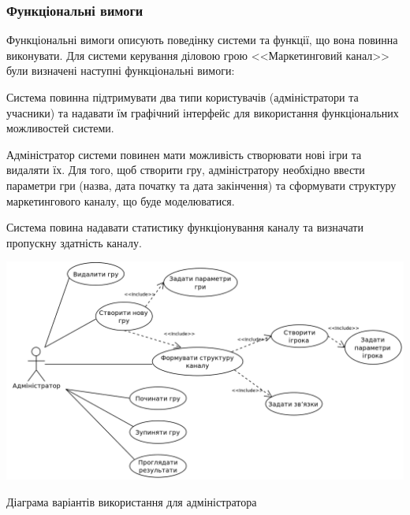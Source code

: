         \subsubsection{Функціональні вимоги}
Функціональні вимоги описують поведінку системи та функції, що вона повинна виконувати. Для системи керування діловою грою <<Маркетинговий канал>> були визначені наступні функціональні вимоги:
            \begin{longEnumerate}
\item Система повинна підтримувати два типи користувачів (адміністратори та учасники) та надавати їм графічний інтерфейс для використання функціональних можливостей системи.
\item Адміністратор системи повинен мати можливість створювати нові ігри та видаляти їх. Для того, щоб створити гру, адміністратору необхідно ввести параметри гри (назва, дата початку та дата закінчення) та сформувати структуру маркетингового каналу, що буде моделюватися. 
\item Система повина надавати статистику функціонування каналу та визначати пропускну здатність каналу.

            \begin{stdfigure}
                \includegraphics[width=7in]{images/uml_uc_admin.png}
                \caption{Діаграма варіантів використання для адміністратора}
                \label{fig:uml_uc_admin}
            \end{stdfigure}


\end{longEnumerate}
